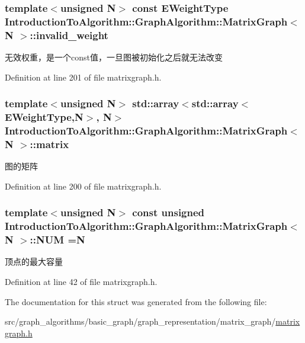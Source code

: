 \subsubsection[{invalid\+\_\+weight}]{\setlength{\rightskip}{0pt plus 5cm}template$<$unsigned N$>$ const {\bf E\+Weight\+Type} {\bf Introduction\+To\+Algorithm\+::\+Graph\+Algorithm\+::\+Matrix\+Graph}$<$ N $>$\+::invalid\+\_\+weight}\label{struct_introduction_to_algorithm_1_1_graph_algorithm_1_1_matrix_graph_accc79376e509d7ffa016ef5003512976}
无效权重，是一个const值，一旦图被初始化之后就无法改变 

Definition at line 201 of file matrixgraph.\+h.

\hypertarget{struct_introduction_to_algorithm_1_1_graph_algorithm_1_1_matrix_graph_ae1febbc0e4a86c325a16a942947a03bf}{}
\subsubsection[{matrix}]{\setlength{\rightskip}{0pt plus 5cm}template$<$unsigned N$>$ std\+::array$<$std\+::array$<${\bf E\+Weight\+Type},N$>$, N$>$ {\bf Introduction\+To\+Algorithm\+::\+Graph\+Algorithm\+::\+Matrix\+Graph}$<$ N $>$\+::matrix}\label{struct_introduction_to_algorithm_1_1_graph_algorithm_1_1_matrix_graph_ae1febbc0e4a86c325a16a942947a03bf}
图的矩阵 

Definition at line 200 of file matrixgraph.\+h.

\hypertarget{struct_introduction_to_algorithm_1_1_graph_algorithm_1_1_matrix_graph_a68d153cb2714464d5c432d667e29f28f}{}
\subsubsection[{N\+U\+M}]{\setlength{\rightskip}{0pt plus 5cm}template$<$unsigned N$>$ const unsigned {\bf Introduction\+To\+Algorithm\+::\+Graph\+Algorithm\+::\+Matrix\+Graph}$<$ N $>$\+::N\+U\+M =N\hspace{0.3cm}{\ttfamily [static]}}\label{struct_introduction_to_algorithm_1_1_graph_algorithm_1_1_matrix_graph_a68d153cb2714464d5c432d667e29f28f}
顶点的最大容量 

Definition at line 42 of file matrixgraph.\+h.



The documentation for this struct was generated from the following file\+:\begin{DoxyCompactItemize}
\item 
src/graph\+\_\+algorithms/basic\+\_\+graph/graph\+\_\+representation/matrix\+\_\+graph/\hyperlink{matrixgraph_8h}{matrixgraph.\+h}\end{DoxyCompactItemize}
